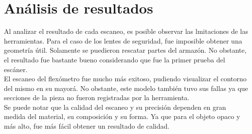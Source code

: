 \section{An\'alisis de resultados}
Al analizar el resultado de cada escaneo, es posible observar las lmitaciones de las herramientas.
Para el caso de los lentes de seguridad, fue imposible obtener una geometr\'ia \'util. Solamente
se puedieron rescatar partes del armaz\'on. No obstante, el resultado fue bastante bueno considerando que
fue la primer prueba del esc\'aner.\\
El escaneo del flex\'ometro fue mucho m\'as exitoso, pudiendo visualizar el contorno del mismo en su mayor\'a.
No obstante, este modelo tambi\'en tuvo sus fallas ya que secciones de la pieza no fueron registradas por
la herramienta.\\

Se puede notar que la calidad del escaneo y su precisi\'on dependen en gran medida del material, su composici\'on y
su forma. Ya que para el objeto opaco y m\'as alto, fue m\'as f\'acil obtener un resultado de calidad.